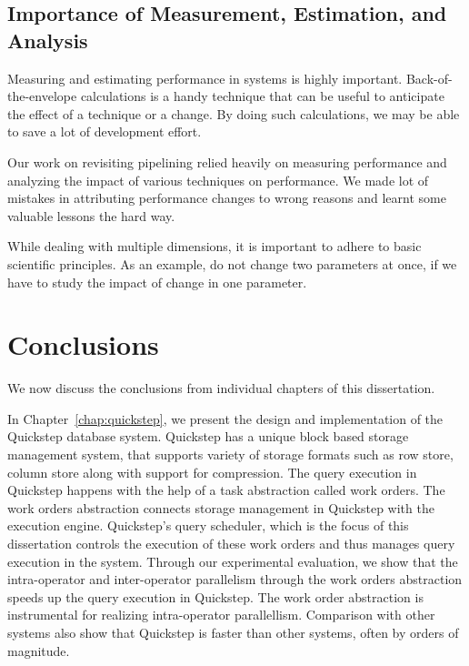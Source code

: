 \subsection{Importance of Measurement, Estimation, and Analysis}
Measuring and estimating performance in systems is highly important. 
Back-of-the-envelope calculations is a handy technique that can be useful to anticipate the effect of a technique or a change.
By doing such calculations, we may be able to save a lot of development effort. 

Our work on revisiting pipelining relied heavily on measuring performance and analyzing the impact of various techniques on performance. 
We made lot of mistakes in attributing performance changes to wrong reasons and learnt some valuable lessons the hard way.

While dealing with multiple dimensions, it is important to adhere to basic scientific principles. 
As an example, do not change two parameters at once, if we have to study the impact of change in one parameter.

\section{Conclusions}
We now discuss the conclusions from individual chapters of this dissertation. 

In Chapter~\ref{chap:quickstep}, we present the design and implementation of the Quickstep database system. 
Quickstep has a unique block based storage management system, that supports variety of storage formats such as row store, column store along with support for compression. 
The query execution in Quickstep happens with the help of a task abstraction called work orders. 
The work orders abstraction connects storage management in Quickstep with the execution engine. 
Quickstep's query scheduler, which is the focus of this dissertation controls the execution of these work orders and thus manages query execution in the system. 
Through our experimental evaluation, we show that the intra-operator and inter-operator parallelism through the work orders abstraction speeds up the query execution in Quickstep.
The work order abstraction is instrumental for realizing intra-operator parallellism.
Comparison with other systems also show that Quickstep is faster than other systems, often by orders of magnitude. 

